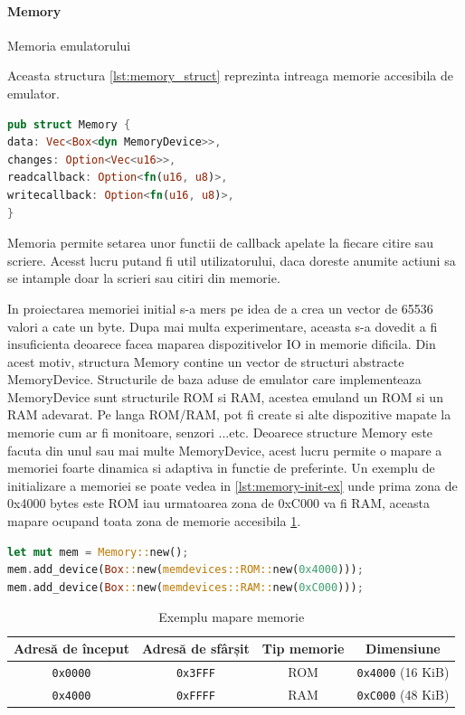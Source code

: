 \documentclass[titlepage,12pt]{article}
\begin{document}
\paragraph{Memory} Memoria emulatorului

Aceasta structura \cref{lst:memory_struct} reprezinta intreaga memorie accesibila de emulator.

\begin{lstlisting}[language=Rust,caption={Structura Memorie},label={lst:memory_struct}]
pub struct Memory {
data: Vec<Box<dyn MemoryDevice>>,
changes: Option<Vec<u16>>,
readcallback: Option<fn(u16, u8)>,
writecallback: Option<fn(u16, u8)>,
}
\end{lstlisting}

Memoria permite setarea unor functii de callback apelate la fiecare citire sau scriere. Acesst lucru putand fi util utilizatorului, daca doreste anumite actiuni sa se intample doar la scrieri sau citiri din memorie.

In proiectarea memoriei initial s-a mers pe idea de a crea un vector de 65536 valori a cate un byte. Dupa mai multa experimentare, aceasta s-a dovedit a fi insuficienta deoarece facea maparea dispozitivelor IO in memorie dificila. Din acest motiv, structura Memory contine un vector de structuri abstracte MemoryDevice.
Structurile de baza aduse de emulator care implementeaza MemoryDevice sunt structurile ROM si RAM, acestea emuland un ROM si un RAM adevarat. Pe langa ROM/RAM, pot fi create si alte dispozitive mapate la memorie cum ar fi monitoare, senzori ...etc.
Deoarece structure Memory este facuta din unul sau mai multe MemoryDevice, acest lucru permite o mapare a memoriei foarte dinamica si adaptiva in functie de preferinte. Un exemplu de initializare a memoriei se poate vedea in \cref{lst:memory-init-ex} unde prima zona de 0x4000 bytes este ROM iau urmatoarea zona de 0xC000 va fi RAM, aceasta mapare ocupand toata zona de memorie accesibila \cref{tab:memory-mapping-ex}.
\begin{lstlisting}[language=Rust,caption={Exemplu initializare memorie},label={lst:memory-init-ex}]
let mut mem = Memory::new();
mem.add_device(Box::new(memdevices::ROM::new(0x4000)));
mem.add_device(Box::new(memdevices::RAM::new(0xC000)));
\end{lstlisting}

\begin{table}[H]
\centering
\begin{tabular}{|c|c|c|c|}
\hline
\textbf{Adresă de început} & \textbf{Adresă de sfârșit} & \textbf{Tip memorie} & \textbf{Dimensiune} \\
\hline
\texttt{0x0000} & \texttt{0x3FFF} & ROM & \texttt{0x4000} (16 KiB) \\
\hline
\texttt{0x4000} & \texttt{0xFFFF} & RAM & \texttt{0xC000} (48 KiB) \\
\hline
\end{tabular}
\caption{Exemplu mapare memorie}
\label{tab:memory-mapping-ex}
\end{table}
\end{document}
